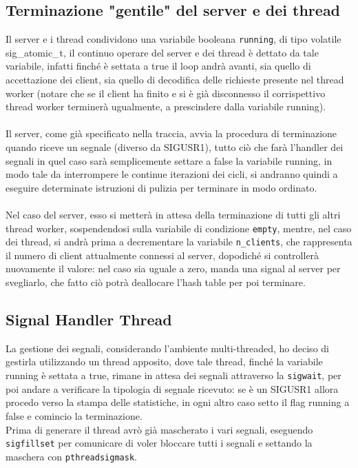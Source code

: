 \newpage

\subsection{Terminazione "gentile" del server e dei thread}
\begin{flushleft}


Il server e i thread condividono una variabile booleana \texttt{running}, di tipo volatile sig\_atomic\_t, il continuo operare del server e dei thread è dettato da tale variabile, infatti finché è settata a true il loop andrà avanti, sia quello di accettazione dei client, sia quello di decodifica delle richieste presente nel thread worker (notare che se il client ha finito e si è già disconnesso il corrispettivo thread worker terminerà ugualmente, a prescindere dalla variabile running).
\\~\\
Il server, come già specificato nella traccia, avvia la procedura di terminazione quando riceve un segnale (diverso da SIGUSR1), tutto ciò che farà l'handler dei segnali in quel caso sarà semplicemente settare a false la variabile running, in modo tale da interrompere le continue iterazioni dei cicli, si andranno quindi a eseguire determinate istruzioni di pulizia per terminare in modo ordinato.
\\~\\
Nel caso del server, esso si metterà in attesa della terminazione di tutti gli altri thread worker, sospendendosi sulla variabile di condizione \texttt{empty}, mentre, nel caso dei thread, si andrà prima a decrementare la variabile \texttt{n\_clients}, che rappresenta il numero di client attualmente connessi al server, dopodiché si controllerà nuovamente il valore: nel caso sia uguale a zero, manda una signal al server per svegliarlo, che fatto ciò potrà deallocare l'hash table per poi terminare.

\end{flushleft}

\subsection{Signal Handler Thread}
\begin{flushleft}

La gestione dei segnali, considerando l'ambiente multi-threaded, ho deciso di gestirla utilizzando un thread apposito, dove tale thread, finché la variabile running è settata a true, rimane in attesa dei segnali attraverso la \texttt{sigwait}, per poi andare a verificare la tipologia di segnale ricevuto: se è un SIGUSR1 allora procedo verso la stampa delle statistiche, in ogni altro caso setto il flag running a false e comincio la terminazione. 
\\
Prima di generare il thread avrò già mascherato i vari segnali, eseguendo \texttt{sigfillset} per comunicare di voler bloccare tutti i segnali e settando la maschera con \texttt{pthread\textunderscore sigmask}.

\end{flushleft}

